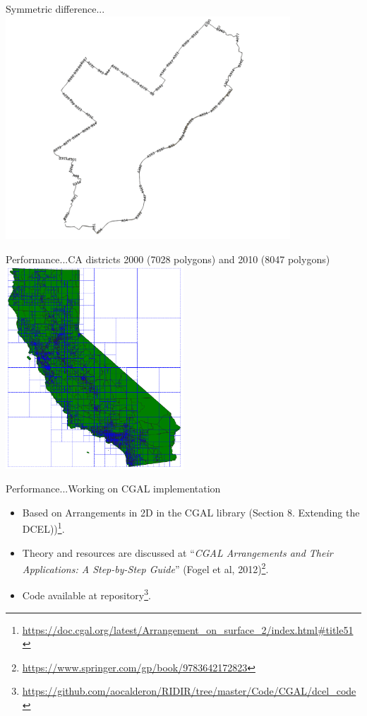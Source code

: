 \documentclass{beamer}
\begin{document}
\begin{frame}{Symmetric difference...}
    \centering
	\includegraphics[trim=1cm 0 1cm 0, clip, width=0.8\textwidth]{figures/06-Correctness/Phili_Symmetric}
\end{frame}

\begin{frame}{Performance...}{CA districts 2000 (7028 polygons) and 2010 (8047 polygons)}
    \centering
	\includegraphics[trim=1cm 0 1cm 0, clip, width=0.5\textwidth]{figures/06-Correctness/CA_Faces}
\end{frame}
\begin{frame}{Performance...}{Working on CGAL implementation}
    \begin{itemize}
        \item Based on Arrangements in 2D in the CGAL library (Section 8. Extending the DCEL))\footnote{\tiny \url{https://doc.cgal.org/latest/Arrangement_on_surface_2/index.html\#title51}}.
        \item Theory and resources are discussed at ``\textit{CGAL Arrangements and Their Applications: A Step-by-Step Guide}'' (Fogel et al, 2012)\footnote{\tiny \url{https://www.springer.com/gp/book/9783642172823}}.
        \item Code available at repository\footnote{\tiny \url{https://github.com/aocalderon/RIDIR/tree/master/Code/CGAL/dcel_code}}.
    \end{itemize}
\end{frame}
\end{document}
